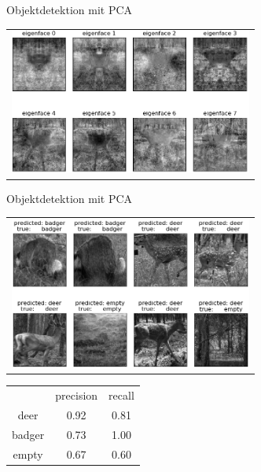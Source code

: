 \begin{frame}[t,fragile]{Objektdetektion mit  PCA}
  \vspace{0.01em}
  {
\begin{table}
\centering
        \begin{tabular}{c}
        \includegraphics[width=8cm]{images/Segmentierung/pca_eigen}\\
         \end{tabular}
        
\end{table}
 }

\end{frame}

\begin{frame}[t,fragile]{Objektdetektion mit  PCA}
  \vspace{0.01em}
  {
\begin{table}
\centering
        \begin{tabular}{c}
        \includegraphics[width=8cm]{images/Segmentierung/pca_test}\\
         \end{tabular}
        \begin{tabular}{ccc}
     				&precision    & recall   \\
		deer   &    0.92  &    0.81\\
		badger   &  0.73   &  1.00\\
		empty     &  0.67   &   0.60\\
         \end{tabular}
\end{table}
 }

\end{frame}


